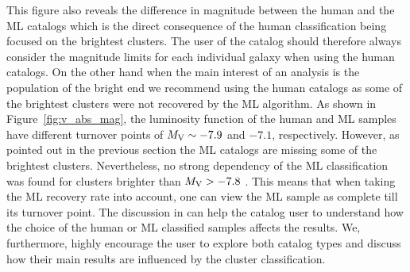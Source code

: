 



This figure also reveals the difference in magnitude between the human and the ML catalogs which is the direct consequence of the human classification being focused on the brightest clusters. 
The user of the catalog should therefore always consider the magnitude limits for each individual galaxy when using the human catalogs. 
On the other hand when the main interest of an analysis is the population of the bright end we recommend using the human catalogs as some of the brightest clusters were not recovered by the ML algorithm.
As shown in Figure~\ref{fig:v_abs_mag}, the luminosity function of the human and ML samples have different turnover points of $M_{\rm V} \sim -7.9$ and $-7.1$, respectively. 
However, as pointed out in the previous section the ML catalogs are missing some of the brightest clusters. Nevertheless, no strong dependency of the ML classification was found for clusters brighter than $M_{\rm V} > -7.8$ \citep{whitmore_star_2021}. This means that when taking the ML recovery rate into account, one can view the ML sample as complete till its turnover point.
The discussion in \citet{whitmore_using_2011} can help the catalog user to understand how the choice of the human or ML classified samples affects the results. We, furthermore, highly encourage the user to explore both catalog types and discuss how their main results are influenced by the cluster classification.


